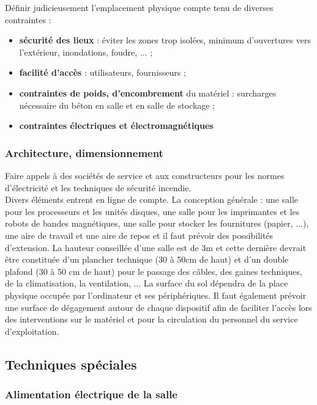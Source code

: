 \documentclass[10pt,a4paper,oneside,titlepage]{report}
\newcommand{\titre}[1]{\textcolor{title}{#1}}
\newcommand{\strong}[1]{\textbf{\titre{#1}}}
\begin{document}
Définir judicieusement l'emplacement physique compte tenu de diverses contraintes :\begin{itemize}
\item \strong{sécurité des lieux} : éviter les zones trop isolées, minimum d'ouvertures vers l'extérieur, inondations, foudre, ... ;
\item \strong{facilité d'accès} : utilisateurs, fournisseurs ;
\item \strong{contraintes de poids, d'encombrement} du matériel : surcharges nécessaire du béton en salle et en salle de stockage ;
\item \strong{contraintes électriques et électromagnétiques}
\end{itemize}

\subsubsection{Architecture, dimensionnement}

Faire appels à des sociétés de service et aux constructeurs pour les normes d'électricité et les techniques de sécurité incendie.\\
Divers éléments entrent en ligne de compte. La conception générale : une salle pour les processeurs et les unités disques, une salle pour les imprimantes et les robots de bandes magnétiques, une salle pour stocker les fournitures (papier, ...), une
aire de travail et une aire de repos et il faut prévoir des possibilités d'extension. La hauteur conseillée d'une salle est de 3m et cette dernière devrait \^etre constituée d'un plancher technique (30 à 50cm de haut) et d'un double plafond (30 à 50
cm de haut) pour le passage des c\^ables, des gaines techniques, de la climatisation, la ventilation, ... La surface du sol dépendra de la place physique occupée par l'ordinateur et ses périphériques. Il faut également prévoir une surface de
dégagement autour de chaque dispositif afin de faciliter l'accès lors des interventions sur le matériel et pour la circulation du personnel du service d'exploitation.

\subsection{Techniques spéciales}

\subsubsection{Alimentation électrique de la salle}
\end{document}
